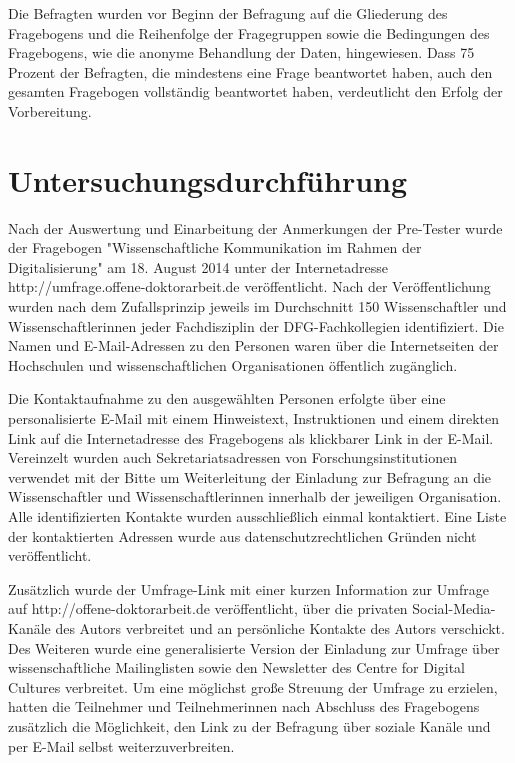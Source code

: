 Die Befragten wurden vor Beginn der Befragung auf die Gliederung des Fragebogens und die Reihenfolge der Fragegruppen sowie die Bedingungen des Fragebogens, wie die anonyme Behandlung der Daten, hingewiesen. Dass 75 Prozent der Befragten, die mindestens eine Frage beantwortet haben, auch den gesamten Fragebogen vollständig beantwortet haben, verdeutlicht den Erfolg der Vorbereitung.

\section{Untersuchungsdurchführung}

Nach der Auswertung und Einarbeitung der Anmerkungen der Pre-Tester wurde der Fragebogen "Wissenschaftliche Kommunikation im Rahmen der Digitalisierung" am 18. August 2014 unter der Internetadresse http://umfrage.offene-doktorarbeit.de veröffentlicht. Nach der Veröffentlichung wurden nach dem Zufallsprinzip jeweils im Durchschnitt 150 Wissenschaftler und Wissenschaftlerinnen jeder Fachdisziplin der DFG-Fachkollegien \cite{DFG_2014b} identifiziert. Die Namen und E-Mail-Adressen zu den Personen waren über die Internetseiten der Hochschulen und wissenschaftlichen Organisationen öffentlich zugänglich.

Die Kontaktaufnahme zu den ausgewählten Personen erfolgte über eine personalisierte E-Mail mit einem Hinweistext, Instruktionen und einem direkten Link auf die Internetadresse des Fragebogens als klickbarer Link in der E-Mail. Vereinzelt wurden auch Sekretariatsadressen von Forschungsinstitutionen verwendet mit der Bitte um Weiterleitung der Einladung zur Befragung an die Wissenschaftler und Wissenschaftlerinnen innerhalb der jeweiligen Organisation. Alle identifizierten Kontakte wurden ausschließlich einmal kontaktiert. Eine Liste der kontaktierten Adressen wurde aus datenschutzrechtlichen Gründen nicht veröffentlicht.

Zusätzlich wurde der Umfrage-Link mit einer kurzen Information zur Umfrage auf http://offene-doktorarbeit.de veröffentlicht, über die privaten Social-Media-Kanäle des Autors verbreitet und an persönliche Kontakte des Autors verschickt. Des Weiteren wurde eine generalisierte Version der Einladung zur Umfrage über wissenschaftliche Mailinglisten sowie den Newsletter des Centre for Digital Cultures verbreitet. Um eine möglichst große Streuung der Umfrage zu erzielen, hatten die Teilnehmer und Teilnehmerinnen nach Abschluss des Fragebogens zusätzlich die Möglichkeit, den Link zu der Befragung über soziale Kanäle und per E-Mail selbst weiterzuverbreiten.

